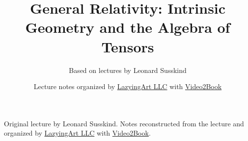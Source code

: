 \documentclass[11pt,oneside]{book}
\begin{document}
\frontmatter
\title{General Relativity: Intrinsic Geometry and the Algebra of Tensors}
\author{Based on lectures by Leonard Susskind}
\date{Lecture notes organized by \href{https://lazying.art}{LazyingArt LLC} with \href{https://github.com/lachlanchen/Video2Book}{Video2Book}}
\maketitle
\begin{center}
\small Original lecture by Leonard Susskind. Notes reconstructed from the lecture and organized by \href{https://lazying.art}{LazyingArt LLC} with \href{https://github.com/lachlanchen/Video2Book}{Video2Book}.
\end{center}
\clearpage
\mainmatter

\end{document}
